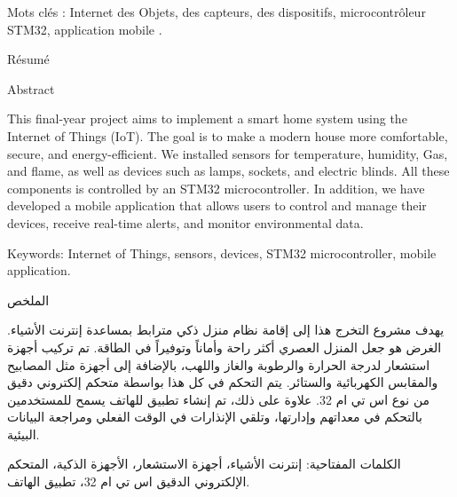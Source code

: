 \documentclass{article}
\begin{document}
Mots clés :  Internet des Objets, des capteurs, des dispositifs, microcontrôleur STM32,  application mobile .

Résumé

Abstract

This final-year project aims to implement a smart home system using the Internet of Things (IoT). The goal is to make a modern house more comfortable, secure, and energy-efficient. We installed sensors for temperature, humidity, Gas, and flame, as well as devices such as lamps, sockets, and electric blinds. All these components is controlled by an STM32 microcontroller. In addition, we have developed a mobile application that allows users to control and manage their devices, receive real-time alerts, and monitor environmental data.

Keywords: Internet of Things, sensors, devices, STM32 microcontroller, mobile application.

الملخص

يهدف مشروع التخرج هذا إلى إقامة نظام منزل ذكي مترابط بمساعدة إنترنت الأشياء. الغرض هو جعل المنزل العصري أكثر راحة وأماناً وتوفيراً في الطاقة. تم تركيب أجهزة استشعار لدرجة الحرارة والرطوبة والغاز واللهب، بالإضافة إلى أجهزة مثل المصابيح والمقابس الكهربائية والستائر. يتم التحكم في كل هذا بواسطة متحكم إلكتروني دقيق من نوع اس تي ام 32. علاوة على ذلك، تم إنشاء تطبيق للهاتف يسمح للمستخدمين بالتحكم في معداتهم وإدارتها، وتلقي الإنذارات في الوقت الفعلي ومراجعة البيانات البيئية. 

الكلمات المفتاحية: إنترنت الأشياء، أجهزة الاستشعار، الأجهزة الذكية، المتحكم الإلكتروني الدقيق اس تي ام 32، تطبيق الهاتف.
\end{document}
